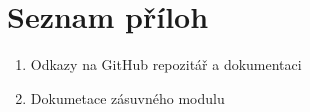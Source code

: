 \documentclass[a4paper,oneside,12pt]{book}
\begin{document}
\chapter*{Seznam příloh} \label{list_attach}

\begin{enumerate}
  \item Odkazy na GitHub repozitář a dokumentaci
  \item Dokumetace zásuvného modulu
\end{enumerate}

 
 
  
\end{document}
